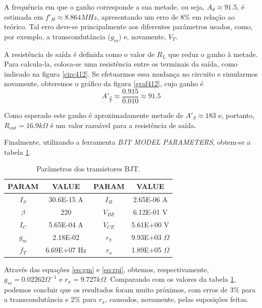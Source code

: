 \documentclass[12pt, a4paper]{article}
\begin{document}
\begin{enumerate}
    A frequência em que o ganho corresponde a sua metade, ou seja, \(A_d \approx 91.5\), é estimada em \(f'_H \approx 8.864MHz\), apresentando um erro de \(8\% \) em relação ao teórico. Tal erro deve-se principalmente aos diferentes parâmetros usados, como, por exemplo, a transcondutância (\(g_m\)) e, novamente, \(V_T\).
    
    A resistência de saída é definida como o valor de \(R_L\) que reduz o ganho à metade. Para calcula-la, coloca-se uma resistência entre os terminais da saída, como indicado na figura \ref{circ412}.
    Se efetuarmos essa mudança no circuito e simularmos novamente, obteremos o gráfico da figura \ref{graf412}, cujo ganho é \[A'_{\frac{d}{2}} \approx \frac{0.915}{0.010} \approx 91.5\]
    
    Como esperado este ganho é aproximadamente metade de \(A'_d \approx 183 \) e, portanto, \(R_{out} = 16.9k\Omega \) é um valor razoável para a resistência de saída.
    
    Finalmente, utilizando a ferramenta \textit{BJT MODEL PARAMETERS}, obtem-se a tabela \ref{table:bjtparam}.
    
    \begin{table} [h!]
            \caption{Parâmetros dos transistores BJT. }
            \centering
            \label{table:bjtparam}
            
                \begin{tabular}{ c | c | c | c } 
        
                PARAM & VALUE & PARAM & VALUE \\
                \hline
                \(I_{S}\) & 30.6E-15 A & \(I_{B}\) & 2.65E-06 A \\
                \(\beta \) & 220 & \(V_{BE}\) & 6.12E-01 V \\
                \(I_{C}\) & 5.65E-04 A & \(V_{CE}\) & 5.61E+00 V\\
                \(g_m \) & 2.18E-02 & \(r_{\pi }\) & 9.93E+03 \(\Omega\) \\
                \(f_{T}\) & 6.69E+07 Hz & \(r_{o}\) & 1.89E+05 \(\Omega\)\\
                \end{tabular}
       \end{table}
    
    
    Através das equações \ref{eq:gm} e \ref{eq:rpi}, obtemos, respectivamente, \(g_m = 0.02262 \Omega^{-1}\) e \(r_{\pi} = 9.727k\Omega\). Comparando com os valores da tabela \ref{table:bjtparam}, podemos concluir que os resultados foram muito próximos, com erros de \(3\% \) para a transcondutância e \( 2 \% \) para \(r_{\pi }\), causados, novamente, pelas suposições feitas.
    

\end{enumerate}
\end{document}
